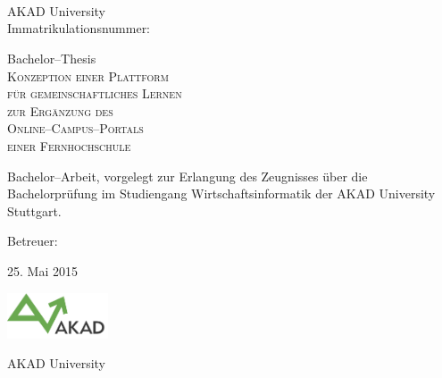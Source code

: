 

\begin{titlepage}


\vspace{5cm}

\Name \\ 
\Strasse \\ 
\PlzOrt\\ 
\href{mailto:\Email}{\Email}

AKAD University\\
Immatrikulationsnummer: \Immatrikulationsnummer

\vfill

Bachelor--Thesis\\
\LARGE
\textsc{Konzeption einer Plattform\\
für gemeinschaftliches Lernen\\
zur Ergänzung des \\
Online--Campus--Portals\\
einer Fernhochschule}

\vfill

\normalsize

Bachelor--Arbeit, vorgelegt zur Erlangung des Zeugnisses über die Bachelorprüfung im Studiengang Wirtschaftsinformatik der AKAD University Stuttgart.

Betreuer: \Betreuer

25. Mai 2015


\vfill

\includegraphics[width=3cm]{akad_logo.png}  

AKAD University 

\end{titlepage}



\normalsize
